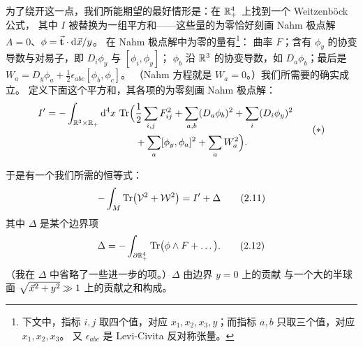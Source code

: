 为了绕开这一点，我们所能期望的最好情形是：在 $\mathbb{R}^4_+$ 上找到一个 Weitzenböck 公式，
其中 $I$ 被替换为一组平方和——这些量的为零恰好刻画 Nahm 极点解
$A=0$、$\phi=\vec{\mathbf{t}}\cdot\mathrm{d}\vec{x}/y$。
在 Nahm 极点解中为零的量有\footnote{下文中，指标 $i,j$ 取四个值，对应
$x_1,x_2,x_3,y$；而指标 $a,b$ 只取三个值，对应 $x_1,x_2,x_3$。
又 $\epsilon_{abc}$ 是 Levi-Civita 反对称张量。}：
曲率 $F$；含有 $\phi_y$ 的协变导数与对易子，即 $D_i\phi_y$ 与 $[\phi_i,\phi_y]$；
$\phi_b$ 沿 $\mathbb{R}^3$ 的协变导数，如 $D_a\phi_b$；最后是
$W_a=D_y\phi_a+\tfrac{1}{2}\epsilon_{abc}[\phi_b,\phi_c]$。
（Nahm 方程就是 $W_a=0$。）我们所需要的确实成立。
定义下面这个平方和，其各项的为零刻画 Nahm 极点解：
\begin{equation}\stepcounter{equation}
\begin{aligned}
  I'=-\int_{\R^3\times\R_+}\mathrm{d}^4x\,\Tr\Bigl(
    &\frac{1}{2}\sum_{i,j}F_{ij}^{2}
    +\sum_{a,b}(D_a\phi_b)^{2}
    +\sum_{i}(D_i\phi_y)^{2}\\
    &+\sum_{a}[\phi_y,\phi_a]^{2}
    +\sum_{a}W_a^{2}\Bigr).
\end{aligned}
\tag{$\ast$}\label{eq:Iprime}
\end{equation}


于是有一个我们所需的恒等式：
\begin{equation}\stepcounter{equation}
  -\int_M\Tr\bigl(\sV^{2}+\sW^{2}\bigr)=I'+\Delta
  \tag{2.11}\label{eq:2.11}
\end{equation}
其中 $\Delta$ 是某个边界项
\begin{equation}\stepcounter{equation}
  \Delta=-\int_{\partial\R^4_+}\Tr\bigl(\phi\wedge F+\dots\bigr).
  \tag{2.12}\label{eq:2.12}
\end{equation}
（我在 $\Delta$ 中省略了一些进一步的项。）$\Delta$ 由边界 $y=0$ 上的贡献
与一个大的半球面 $\sqrt{\vec{x}^{2}+y^{2}}\gg 1$ 上的贡献之和构成。


